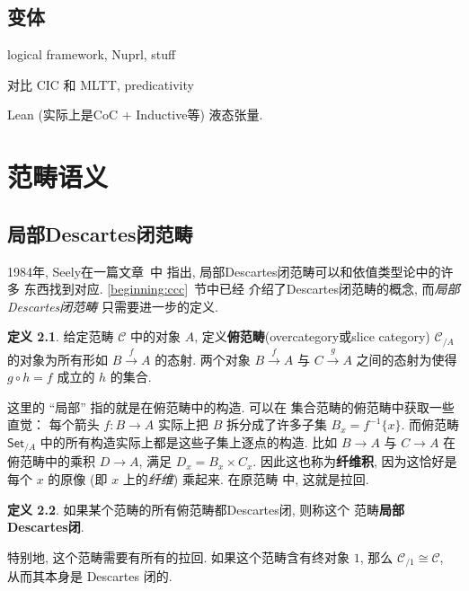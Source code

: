 \documentclass[UTF8]{ctexbook}
\theoremstyle{plain}
\theoremstyle{definition}
\newtheorem{definition}{定义}[chapter]
\theoremstyle{remark}
\begin{document}



\section{变体}

logical framework, Nuprl, stuff

对比 CIC 和 MLTT, predicativity

Lean (实际上是CoC + Inductive等)
液态张量.\cite{scholze:2020:liquid}

\chapter{范畴语义}

\section{局部Descartes闭范畴}

1984年, Seely在一篇文章~\cite{seely:1984:lccc}中
指出, 局部Descartes闭范畴可以和依值类型论中的许多
东西找到对应. \ref{beginning:ccc}~节中已经
介绍了Descartes闭范畴的概念, 而\emph{局部Descartes闭范畴}
只需要进一步的定义.
\begin{definition}
给定范畴 \(\mathcal C\) 中的对象 \(A\),
定义\textbf{俯范畴}(overcategory或slice category)
\(\mathcal C_{/A}\) 的对象为所有形如
\(B \xrightarrow{f} A\) 的态射. 两个对象
\(B \xrightarrow f A\) 与 \(C \xrightarrow g A\)
之间的态射为使得 \(g \circ h = f\) 成立的 \(h\) 的集合.
\end{definition}
这里的 “局部” 指的就是在俯范畴中的构造. 可以在
集合范畴的俯范畴中获取一些直觉： 每个箭头
\(f : B \to A\) 实际上把 \(B\) 拆分成了许多子集
\(B_x = f^{-1}\{x\}\). 而俯范畴 \(\textsf{Set}_{/A}\)
中的所有构造实际上都是这些子集上逐点的构造. 比如
\(B \to A\) 与 \(C \to A\) 在俯范畴中的乘积
\(D \to A\), 满足 \(D_x = B_x \times C_x\).
因此这也称为\textbf{纤维积}, 因为这恰好是每个 \(x\)
的原像 (即 \(x\) 上的\emph{纤维}) 乘起来. 在原范畴
中, 这就是拉回.
\begin{definition}
如果某个范畴的所有俯范畴都Descartes闭, 则称这个
范畴\textbf{局部Descartes闭}.
\end{definition}
特别地, 这个范畴需要有所有的拉回. 如果这个范畴含有终对象
\(1\), 那么 \(\mathcal C_{/1} \cong \mathcal C\),
从而其本身是 Descartes 闭的.
\end{document}
